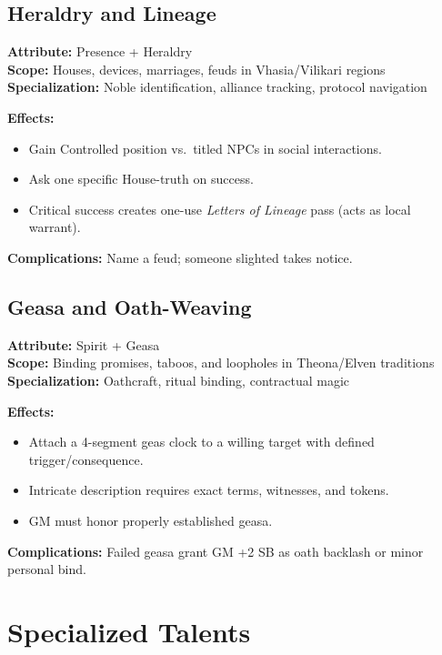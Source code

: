 \subsection{Heraldry and Lineage}
\label{subsec:heraldry}

\textbf{Attribute:} Presence + Heraldry\\
\textbf{Scope:} Houses, devices, marriages, feuds in Vhasia/Vilikari regions\\
\textbf{Specialization:} Noble identification, alliance tracking, protocol navigation

\textbf{Effects:}
\begin{itemize}
\item Gain Controlled position vs.\ titled NPCs in social interactions.
\item Ask one specific House-truth on success.
\item Critical success creates one-use \emph{Letters of Lineage} pass (acts as local warrant).
\end{itemize}

\textbf{Complications:} Name a feud; someone slighted takes notice.

\subsection{Geasa and Oath-Weaving}
\label{subsec:geasa}

\textbf{Attribute:} Spirit + Geasa\\
\textbf{Scope:} Binding promises, taboos, and loopholes in Theona/Elven traditions\\
\textbf{Specialization:} Oathcraft, ritual binding, contractual magic

\textbf{Effects:}
\begin{itemize}
\item Attach a 4-segment geas clock to a willing target with defined trigger/consequence.
\item Intricate description requires exact terms, witnesses, and tokens.
\item GM must honor properly established geasa.
\end{itemize}

\textbf{Complications:} Failed geasa grant GM +2 SB as oath backlash or minor personal bind.

\section{Specialized Talents}
\label{sec:specialized-talents}

